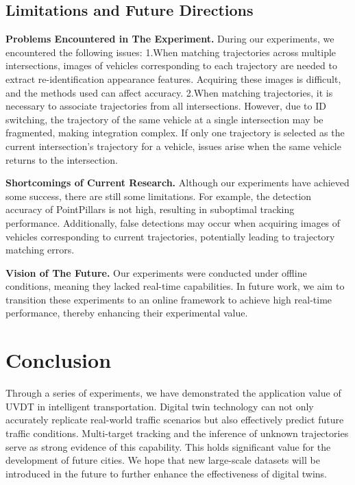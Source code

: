 \documentclass[lettersize,journal]{IEEEtran}
\begin{document}
\subsection{Limitations and Future Directions}

\textbf{Problems Encountered in The Experiment.}
During our experiments, we encountered the following issues:  
1.When matching trajectories across multiple intersections, images of vehicles corresponding to each trajectory are needed to extract re-identification appearance features. 
Acquiring these images is difficult, and the methods used can affect accuracy.  
2.When matching trajectories, it is necessary to associate trajectories from all intersections. 
However, due to ID switching, the trajectory of the same vehicle at a single intersection may be fragmented, making integration complex. 
If only one trajectory is selected as the current intersection's trajectory for a vehicle, issues arise when the same vehicle returns to the intersection.

\textbf{Shortcomings of Current Research.}
Although our experiments have achieved some success, there are still some limitations. 
For example, the detection accuracy of PointPillars is not high, resulting in suboptimal tracking performance. 
Additionally, false detections may occur when acquiring images of vehicles corresponding to current trajectories, potentially leading to trajectory matching errors.

\textbf{Vision of The Future.}
Our experiments were conducted under offline conditions, meaning they lacked real-time capabilities. 
In future work, we aim to transition these experiments to an online framework to achieve high real-time performance, thereby enhancing their experimental value.


\section{Conclusion}

Through a series of experiments, we have demonstrated the application value of UVDT in intelligent transportation. 
Digital twin technology can not only accurately replicate real-world traffic scenarios but also effectively predict future traffic conditions. 
Multi-target tracking and the inference of unknown trajectories serve as strong evidence of this capability. 
This holds significant value for the development of future cities.
We hope that new large-scale datasets will be introduced in the future to further enhance the effectiveness of digital twins.




\end{document}
